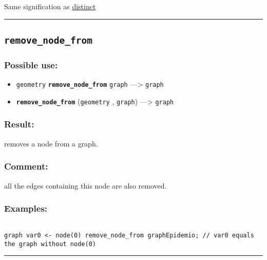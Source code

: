 \documentclass[]{book}
\providecommand{\tightlist}{%
  \setlength{\itemsep}{0pt}\setlength{\parskip}{0pt}}
\theoremstyle{definition}
\theoremstyle{definition}
\theoremstyle{definition}
\theoremstyle{remark}
\begin{document}
Same signification as \href{OperatorsDH\#distinct}{distinct}

\begin{center}\rule{0.5\linewidth}{\linethickness}\end{center}

\subsection{\texorpdfstring{\texttt{remove\_node\_from}}{remove\_node\_from}}\label{remove_node_from}

\subsubsection{Possible use:}\label{possible-use-432}

\begin{itemize}
\tightlist
\item
  \texttt{geometry} \textbf{\texttt{remove\_node\_from}} \texttt{graph}
  ---\textgreater{} \texttt{graph}
\item
  \textbf{\texttt{remove\_node\_from}} (\texttt{geometry} ,
  \texttt{graph}) ---\textgreater{} \texttt{graph}
\end{itemize}

\subsubsection{Result:}\label{result-418}

removes a node from a graph.

\subsubsection{Comment:}\label{comment-82}

all the edges containing this node are also removed.

\subsubsection{Examples:}\label{examples-296}

\begin{verbatim}
 
graph var0 <- node(0) remove_node_from graphEpidemio; // var0 equals the graph without node(0)
\end{verbatim}

\begin{center}\rule{0.5\linewidth}{\linethickness}\end{center}
\end{document}
